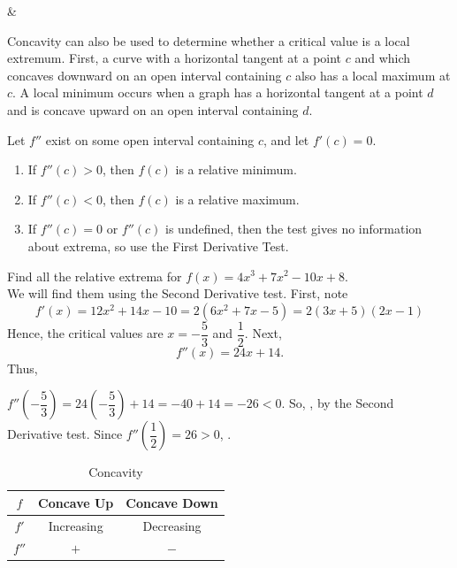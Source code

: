 \documentclass{book}
\begin{document}
\begin{Videos}
 &
\end{Videos}

Concavity can also be used to determine whether a critical value is a local extremum. First, a curve with a horizontal tangent at a point $c$ and which concaves downward on an open interval containing $c$ also has a local maximum at $c$.  A local minimum occurs when a graph has a horizontal tangent at a point $d$ and is concave upward on an open interval containing $d$.

\begin{Prop} Let $f''$ exist on some open interval containing $c$, and let $f'(c) = 0$.
\begin{enumerate}
\item If $f''(c) > 0$, then $f(c)$ is a relative minimum.\\

\item If $f''(c) < 0$, then $f(c)$ is a relative maximum.\\

\item If $f''(c) = 0$ or $f''(c)$ is undefined, then the test gives no information about extrema, so use the First Derivative Test.\\
\end{enumerate}
\end{Prop}\vs

\begin{Exam} Find all the relative extrema for $f(x) = 4x^3 + 7x^2 - 10x + 8$.\\

We will find them using the Second Derivative test. First, note 
\[f'(x) = 12x^2 + 14x - 10 = 2(6x^2+7x-5) = 2(3x+5)(2x-1)\] Hence, the critical values are $x= -\dfrac{5}{3}$ and $\dfrac{1}{2}$. Next, \[f''(x) = 24x + 14.\] Thus, 

$f''\left(-\dfrac{5}{3}\right) = 24\left(-\dfrac{5}{3}\right) +14 = -40 + 14 = -26 < 0$. So, , by the Second Derivative test. Since $f''\left(\dfrac{1}{2}\right) = 26 > 0$, . 
\end{Exam}\vs

\begin{table}[h]
  \centering
  \caption{Concavity}
    \begin{tabular}{c|c|c}
    $f$   & Concave Up & Concave Down \\  \hline
    $f'$   & Increasing & Decreasing \\  \hline
    $f''$  & $+$   & $-$ \\
    \end{tabular}%
  \label{tab:addlabel}%
\end{table}%
\end{document}
